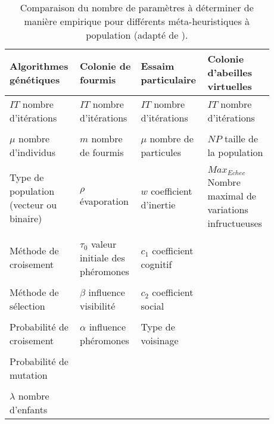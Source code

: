 \begin{table}
\centering
\small
\begin{tabular}{L{0.22\linewidth} L{0.22\linewidth} L{0.22\linewidth} L{0.22\linewidth}}
    \toprule
    \textbf{Algorithmes génétiques}          & \textbf{Colonie de fourmis}                &  \textbf{Essaim particulaire}   & \textbf{Colonie d’abeilles virtuelles}                  \\
    \midrule
    $IT$ nombre d’itérations                & $IT$ nombre d’itérations                    & $IT$ nombre d’itérations        & $IT$ nombre d’itérations                          \\
    \\
    $\mu$ nombre d’individus                 & $m$ nombre de fourmis                      & $\mu$ nombre de particules       & $NP$ taille de la population                            \\
    \\
    Type de population (vecteur ou binaire)  & $\rho$ évaporation                         & $w$ coefficient d’inertie       & $Max_{Echec}$ Nombre maximal de variations infructueuses  \\
    \\
    Méthode de croisement                    & $\tau_{0}$ valeur initiale des phéromones  & $c_{1}$ coefficient cognitif    &                                                         \\
    \\
    Méthode de sélection                     & $\beta$ influence visibilité               & $c_{2}$ coefficient social      &                                                         \\
    \\
    Probabilité de croisement                & $\alpha$ influence phéromones              & Type de voisinage               &                                                         \\
    \\
    Probabilité de mutation                  &                                            &                                 &                                                         \\
    \\
    $\lambda$ nombre d’enfants               &                                            &                                 &                                                         \\
    \bottomrule
\end{tabular}
\caption{Comparaison du nombre de paramètres à déterminer de manière empirique pour différents
         méta-heuristiques à population (adapté de \cite{Armand-Decker2015}).
         \label{tab:meta_compare}}
\end{table}

